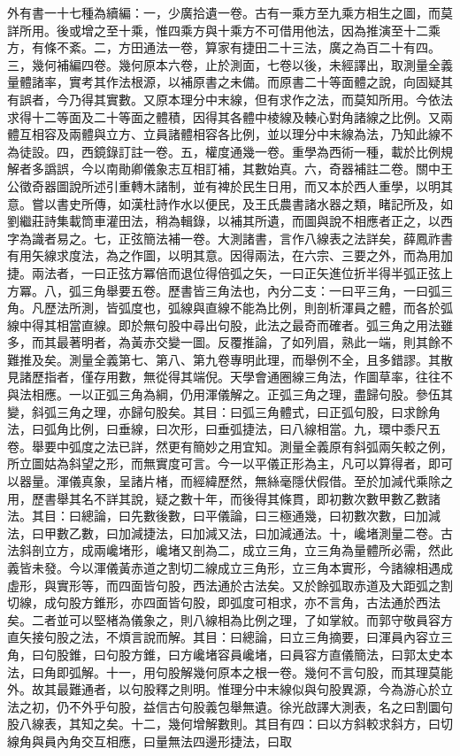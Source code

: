 \begin{pinyinscope}
外有書一十七種為續編：一，少廣拾遺一卷。古有一乘方至九乘方相生之圖，而莫詳所用。後或增之至十乘，惟四乘方與十乘方不可借用他法，因為推演至十二乘方，有條不紊。二，方田通法一卷，算家有捷田二十三法，廣之為百二十有四。三，幾何補編四卷。幾何原本六卷，止於測面，七卷以後，未經譯出，取測量全義量體諸率，實考其作法根源，以補原書之未備。而原書二十等面體之說，向固疑其有誤者，今乃得其實數。又原本理分中末線，但有求作之法，而莫知所用。今依法求得十二等面及二十等面之體積，因得其各體中棱線及輳心對角諸線之比例。又兩體互相容及兩體與立方、立員諸體相容各比例，並以理分中末線為法，乃知此線不為徒設。四，西鏡錄訂註一卷。五，權度通幾一卷。重學為西術一種，載於比例規解者多譌誤，今以南勛卿儀象志互相訂補，其數始真。六，奇器補註二卷。關中王公徵奇器圖說所述引重轉木諸制，並有裨於民生日用，而又本於西人重學，以明其意。嘗以書史所傳，如漢杜詩作水以便民，及王氏農書諸水器之類，睹記所及，如劉繼莊詩集載筒車灌田法，稍為輯錄，以補其所遺，而圖與說不相應者正之，以西字為識者易之。七，正弦簡法補一卷。大測諸書，言作八線表之法詳矣，薛鳳祚書有用矢線求度法，為之作圖，以明其意。因得兩法，在六宗、三要之外，而為用加捷。兩法者，一曰正弦方冪倍而退位得倍弧之矢，一曰正矢進位折半得半弧正弦上方冪。八，弧三角舉要五卷。歷書皆三角法也，內分二支：一曰平三角，一曰弧三角。凡歷法所測，皆弧度也，弧線與直線不能為比例，則剖析渾員之體，而各於弧線中得其相當直線。即於無句股中尋出句股，此法之最奇而確者。弧三角之用法雖多，而其最著明者，為黃赤交變一圖。反覆推論，了如列眉，熟此一端，則其餘不難推及矣。測量全義第七、第八、第九卷專明此理，而舉例不全，且多錯謬。其散見諸歷指者，僅存用數，無從得其端倪。天學會通圈線三角法，作圖草率，往往不與法相應。一以正弧三角為綱，仍用渾儀解之。正弧三角之理，盡歸句股。參伍其變，斜弧三角之理，亦歸句股矣。其目：曰弧三角體式，曰正弧句股，曰求餘角法，曰弧角比例，曰垂線，曰次形，曰垂弧捷法，曰八線相當。九，環中黍尺五卷。舉要中弧度之法已詳，然更有簡妙之用宜知。測量全義原有斜弧兩矢較之例，所立圖姑為斜望之形，而無實度可言。今一以平儀正形為主，凡可以算得者，即可以器量。渾儀真象，呈諸片楮，而經緯歷然，無絲毫隱伏假借。至於加減代乘除之用，歷書舉其名不詳其說，疑之數十年，而後得其條貫，即初數次數甲數乙數諸法。其目：曰總論，曰先數後數，曰平儀論，曰三極通幾，曰初數次數，曰加減法，曰甲數乙數，曰加減捷法，曰加減又法，曰加減通法。十，巉堵測量二卷。古法斜剖立方，成兩巉堵形，巉堵又剖為二，成立三角，立三角為量體所必需，然此義皆未發。今以渾儀黃赤道之割切二線成立三角形，立三角本實形，今諸線相遇成虛形，與實形等，而四面皆句股，西法通於古法矣。又於餘弧取赤道及大距弧之割切線，成句股方錐形，亦四面皆句股，即弧度可相求，亦不言角，古法通於西法矣。二者並可以堅楮為儀象之，則八線相為比例之理，了如掌紋。而郭守敬員容方直矢接句股之法，不煩言說而解。其目：曰總論，曰立三角摘要，曰渾員內容立三角，曰句股錐，曰句股方錐，曰方巉堵容員巉堵，曰員容方直儀簡法，曰郭太史本法，曰角即弧解。十一，用句股解幾何原本之根一卷。幾何不言句股，而其理莫能外。故其最難通者，以句股釋之則明。惟理分中末線似與句股異源，今為游心於立法之初，仍不外乎句股，益信古句股義包舉無遺。徐光啟譯大測表，名之曰割圜句股八線表，其知之矣。十二，幾何增解數則。其目有四：曰以方斜較求斜方，曰切線角與員內角交互相應，曰量無法四邊形捷法，曰取
\end{pinyinscope}
